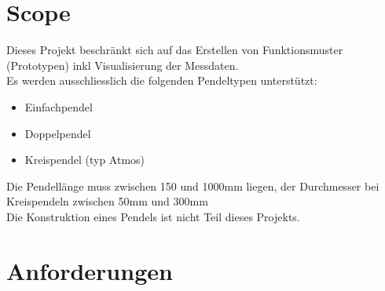 \section{Scope}
Dieses Projekt beschränkt sich auf das Erstellen von Funktionsmuster (Prototypen) inkl Visualisierung der Messdaten.\\
Es werden ausschliesslich die folgenden Pendeltypen unterstützt:
\begin{itemize}
	\item Einfachpendel
	\item Doppelpendel
	\item Kreispendel (typ Atmos)
\end{itemize}
Die Pendellänge muss zwischen 150 und 1000mm liegen, der Durchmesser bei Kreispendeln zwischen 50mm und 300mm\\
Die Konstruktion eines Pendels ist nicht Teil dieses Projekts.

\section{Anforderungen}

